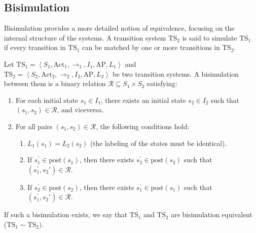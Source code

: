 \subsection{Bisimulation}
Bisimulation provides a more detailed notion of equivalence, focusing on the internal structure of the systems.
A transition system $\text{TS}_2$  is said to simulate $\text{TS}_1$ if every transition in $\text{TS}_1$ can be matched by one or more transitions in $\text{TS}_2$.
\begin{definition}
    Let $\text{TS}_1=\left\langle S_1,\text{Act}_1,\rightarrow_1,I_1,\text{AP},L_1\right\rangle$ and \\ 
    $\text{TS}_2=\left\langle S_2,\text{Act}_2,\rightarrow_2,I_2,\text{AP},L_2\right\rangle$ be two transition systems.
    A bisimulation between them is a binary relation $\mathcal{R}\subseteq S_1\times S_2$ satisfying:
    \begin{enumerate}
        \item For each initial state $s_1\in I_1$, there exists an initial state $s_2\in I_2$ such that $(s_1,s_2)\in \mathcal{R}$, and viceversa. 
        \item For all pairs $(s_1,s_2)\in \mathcal{R}$, the following conditions hold: 
            \begin{enumerate}
                \item $L_1(s_1)=L_2(s_2)$ (the labeling of the states must be identical). 
                \item If $s_1^\prime\in\text{post}(s_1)$, then there exists $s_2^\prime\in\text{post}(s_2)$ such that $(s_1^\prime,s_2\prime)\in\mathcal{R}$. 
                \item If $s_2^\prime\in\text{post}(s_2)$, then there exists $s_1^\prime\in\text{post}(s_1)$ such that $(s_1^\prime,s_2\prime)\in\mathcal{R}$. 
            \end{enumerate}
    \end{enumerate}
    If such a bisimulation exists, we say that $\text{TS}_1$ and $\text{TS}_2$ are bisimulation equivalent ($\text{TS}_1\sim \text{TS}_2)$. 
\end{definition}

